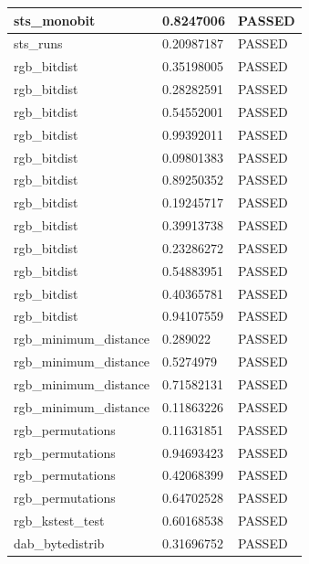 \documentclass[conference]{IEEEtran}
\begin{document}
\begin{center}
\begin{table}[H]
\begin{tabular}{|l|l|l|}
sts\_monobit                           & 0.8247006  & PASSED \\ \hline
sts\_runs                              & 0.20987187 & PASSED \\ \hline
rgb\_bitdist                           & 0.35198005 & PASSED \\ \hline
rgb\_bitdist                           & 0.28282591 & PASSED \\ \hline
rgb\_bitdist                           & 0.54552001 & PASSED \\ \hline
rgb\_bitdist                           & 0.99392011 & PASSED \\ \hline
rgb\_bitdist                           & 0.09801383 & PASSED \\ \hline
rgb\_bitdist                           & 0.89250352 & PASSED \\ \hline
rgb\_bitdist                           & 0.19245717 & PASSED \\ \hline
rgb\_bitdist                           & 0.39913738 & PASSED \\ \hline
rgb\_bitdist                           & 0.23286272 & PASSED \\ \hline
rgb\_bitdist                           & 0.54883951 & PASSED \\ \hline
rgb\_bitdist                           & 0.40365781 & PASSED \\ \hline
rgb\_bitdist                           & 0.94107559 & PASSED \\ \hline
rgb\_minimum\_distance                 & 0.289022   & PASSED \\ \hline
rgb\_minimum\_distance                 & 0.5274979  & PASSED \\ \hline
rgb\_minimum\_distance                 & 0.71582131 & PASSED \\ \hline
rgb\_minimum\_distance                 & 0.11863226 & PASSED \\ \hline
rgb\_permutations                      & 0.11631851 & PASSED \\ \hline
rgb\_permutations                      & 0.94693423 & PASSED \\ \hline
rgb\_permutations                      & 0.42068399 & PASSED \\ \hline
rgb\_permutations                      & 0.64702528 & PASSED \\ \hline
rgb\_kstest\_test                      & 0.60168538 & PASSED \\ \hline
dab\_bytedistrib                       & 0.31696752 & PASSED \\ \hline

\end{tabular}
\end{table}
\end{center}
\end{document}

